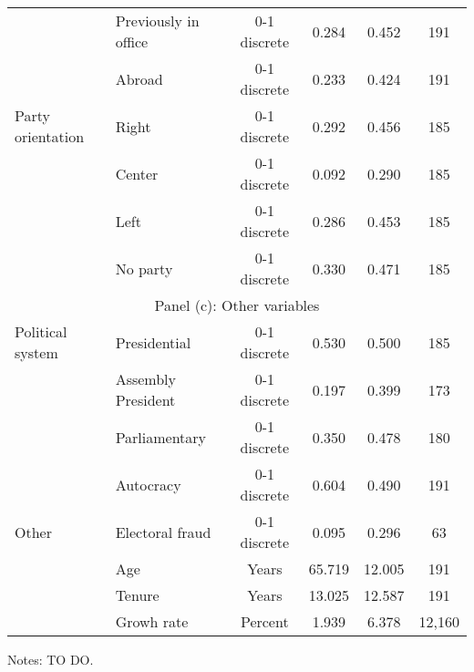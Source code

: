 \begin{table}[h!]
{\begin{threeparttable}
\begin{tabular}{llcccc}
	& Previously in office & 0-1 discrete & 0.284  & 0.452  & 191                                                              \\
	& Abroad               & 0-1 discrete & 0.233  & 0.424  & 191                                                              \\[1ex]
	Party orientation       & Right                & 0-1 discrete & 0.292  & 0.456  & 185                                                              \\
	& Center               & 0-1 discrete & 0.092  & 0.290  & 185                                                              \\
	& Left                 & 0-1 discrete & 0.286  & 0.453  & 185                                                              \\
	& No party             & 0-1 discrete & 0.330  & 0.471  & 185                                                              \\[1ex]
	\multicolumn{6}{c}{Panel (c): Other variables}                                                                                                           \\[1ex]
	Political system        & Presidential         & 0-1 discrete & 0.530  & 0.500  & 185                                                              \\
	& Assembly President   & 0-1 discrete & 0.197  & 0.399  & 173                                                              \\
	& Parliamentary        & 0-1 discrete & 0.350  & 0.478  & 180                                                              \\
	& Autocracy            & 0-1 discrete & 0.604  & 0.490  & 191                                                              \\[1ex]
	Other                   & Electoral fraud      & 0-1 discrete & 0.095  & 0.296  & 63                                                               \\
	& Age                  & Years        & 65.719 & 12.005 & 191                                                              \\
	& Tenure               & Years        & 13.025 & 12.587 & 191                                                              \\
	& Growh rate           & Percent      & 1.939  & 6.378  & 12,160                                                           \\ \hline \hline
\end{tabular}
		\begin{tablenotes}
			\footnotesize{Notes: TO DO.}
		\end{tablenotes}
	\end{threeparttable}
}
\end{table}